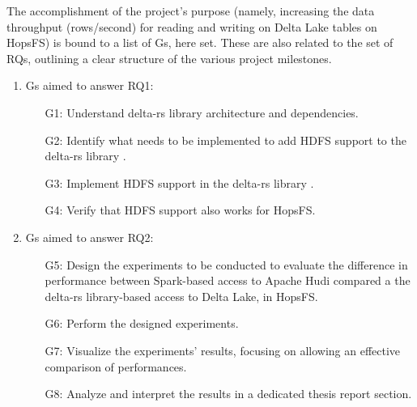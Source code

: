 The accomplishment of the project's purpose (namely, increasing the data throughput (rows/second) for reading and writing on Delta Lake tables on \gls{HopsFS}) is bound to a list of \glspl{G}, here set. These are also related to the set of \glspl{RQ}, outlining a clear structure of the various project milestones.

\begin{enumerate}
    \item \glspl{G} aimed to answer RQ1: 
        \begin{enumerate}
            \item[G1:] Understand delta-rs library \cite{DeltaioDeltars2024} architecture and dependencies.
            \item[G2:] Identify what needs to be implemented to add \gls{HDFS} support to the delta-rs library \cite{DeltaioDeltars2024}.  
            \item[G3:] Implement \gls{HDFS} support in the delta-rs library \cite{DeltaioDeltars2024}.
            \item[G4:] Verify that \gls{HDFS} support also works for \gls{HopsFS}.
        \end{enumerate}
    \item \glspl{G} aimed to answer RQ2:
        \begin{enumerate}
            \item[G5:] Design the experiments to be conducted to evaluate the difference in performance between Spark-based access to Apache Hudi compared a the delta-rs \cite{DeltaioDeltars2024} library-based access to Delta Lake, in \gls{HopsFS}. 
            \item[G6:] Perform the designed experiments.
            \item[G7:] Visualize the experiments' results, focusing on allowing an effective comparison of performances.
            \item[G8:] Analyze and interpret the results in a dedicated thesis report section.
        \end{enumerate}
\end{enumerate}

